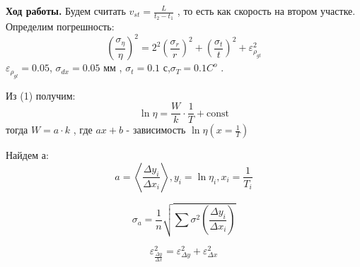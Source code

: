 \documentclass[10pt]{article}
\begin{document}
\textbf{Ход работы.}
Будем считать $v_{st} = \frac{L}{t_2 - t_1}$ , то есть как скорость на втором участке.\\
Определим погрешность:
\begin{equation}
    (\frac{\sigma_\eta}{\eta})^2 = 2^2(\frac{\sigma_r}{r})^2 +  (\frac{\sigma_t}{t})^2 + \varepsilon^2_{\rho_{gl}}
\end{equation} 
$\varepsilon_{\rho_{gl}} = 0.05$, $\sigma_{dx}= 0.05 $ мм , $\sigma_t= 0.1$ с,$\sigma_T= 0.1 C^o$ .

Из (1) получим:
\begin{equation} 
    \ln \eta = \frac{W}{k} \cdot \frac{1}{T} + \text{const}
\end{equation}
тогда $W = a \cdot k$ , где $ax + b$ - зависимость $\ln \eta (x = \frac{1}{T})$

Найдем $а$:
\begin{equation}
    a = \left < \frac{\Delta y_i}{\Delta x_i} \right > , y_i = \ln \eta_i , x_i = \frac{1}{T_i}
\end{equation}

\begin{equation}
    \sigma_a = \frac{1}{n} \sqrt{ \sum \sigma^2 \left(\frac{\Delta y_i}{\Delta x_i} \right)}
\end{equation}

\begin{equation}
    \varepsilon^2_{\frac{\Delta y}{\Delta x}} = \varepsilon^2_{\Delta y} + \varepsilon^2_{\Delta x}
\end{equation}
\end{document}
